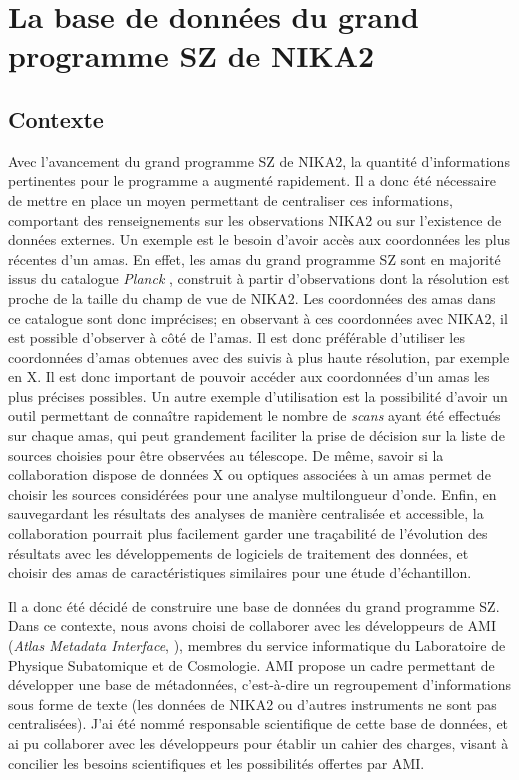 \section{La base de données du grand programme SZ de NIKA2}
\label{sec:nk_ami}

\subsection{Contexte}

Avec l'avancement du grand programme SZ de NIKA2, la quantité d'informations pertinentes pour le programme a augmenté rapidement.
Il a donc été nécessaire de mettre en place un moyen permettant de centraliser ces informations, comportant des renseignements sur les observations NIKA2 ou sur l'existence de données externes.
Un exemple est le besoin d'avoir accès aux coordonnées les plus récentes d'un amas.
En effet, les amas du grand programme SZ sont en majorité issus du catalogue \textit{Planck} \cite{planck_collaboration_planck_2016-3}, construit à partir d'observations dont la résolution est proche de la taille du champ de vue de NIKA2.
Les coordonnées des amas dans ce catalogue sont donc imprécises; en observant à ces coordonnées avec NIKA2, il est possible d'observer à côté de l'amas.
Il est donc préférable d'utiliser les coordonnées d'amas obtenues avec des suivis à plus haute résolution, par exemple en X.
Il est donc important de pouvoir accéder aux coordonnées d'un amas les plus précises possibles.
Un autre exemple d'utilisation est la possibilité d'avoir un outil permettant de connaître rapidement le nombre de \textit{scans} ayant été effectués sur chaque amas, qui peut grandement faciliter la prise de décision sur la liste de sources choisies pour être observées au télescope.
De même, savoir si la collaboration dispose de données X ou optiques associées à un amas permet de choisir les sources considérées pour une analyse multilongueur d'onde.
Enfin, en sauvegardant les résultats des analyses de manière centralisée et accessible, la collaboration pourrait plus facilement garder une traçabilité de l'évolution des résultats avec les développements de logiciels de traitement des données, et choisir des amas de caractéristiques similaires pour une étude d'échantillon.

Il a donc été décidé de construire une base de données du grand programme SZ.
Dans ce contexte, nous avons choisi de collaborer avec les développeurs de AMI (\textit{Atlas Metadata Interface}, \cite{albrand_atlas_2010}), membres du service informatique du Laboratoire de Physique Subatomique et de Cosmologie.
AMI propose un cadre permettant de développer une base de métadonnées, c'est-à-dire un regroupement d'informations sous forme de texte (les données de NIKA2 ou d'autres instruments ne sont pas centralisées).
J'ai été nommé responsable scientifique de cette base de données, et ai pu collaborer avec les développeurs pour établir un cahier des charges, visant à concilier les besoins scientifiques et les possibilités offertes par AMI.

